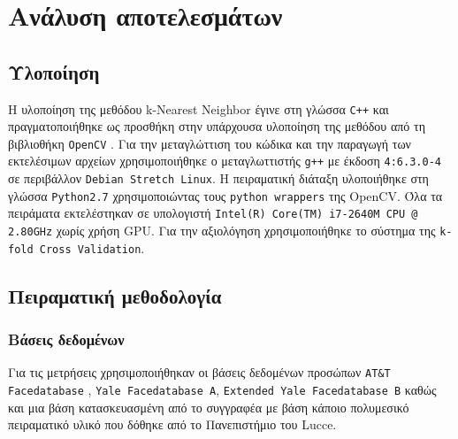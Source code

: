 \chapter{Ανάλυση αποτελεσμάτων}\label{ch:results}


\section{Υλοποίηση}\label{sec:implementation}
H υλοποίηση της μεθόδου k-Nearest Neighbor έγινε στη γλώσσα \texttt{C++} και πραγματοποιήθηκε
ως προσθήκη στην υπάρχουσα υλοποίηση της μεθόδου από τη βιβλιοθήκη \texttt{OpenCV} .
Για την μεταγλώττιση του κώδικα και την παραγωγή των εκτελέσιμων αρχείων χρησιμοποιήθηκε
ο μεταγλωττιστής \texttt{g++} με έκδοση \texttt{4:6.3.0-4} σε περιβάλλον \texttt{Debian Stretch Linux}.
Η πειραματική διάταξη υλοποιήθηκε στη γλώσσα \texttt{Python2.7} χρησιμοποιώντας
τους \texttt{python wrappers} της OpenCV. Όλα τα πειράματα εκτελέστηκαν σε υπολογιστή
\texttt{Intel(R) Core(TM) i7-2640M CPU @ 2.80GHz} χωρίς χρήση GPU. Για την αξιολόγηση
χρησιμοποιήθηκε το σύστημα της \texttt{k-fold Cross Validation}.


\section{Πειραματική μεθοδολογία}\label{sec:methodology}
\subsection{Βάσεις δεδομένων}
Για τις μετρήσεις χρησιμοποιήθηκαν οι βάσεις δεδομένων προσώπων \texttt{AT\&T Facedatabase}
,
\texttt{Yale Facedatabase A},
\texttt{Extended Yale Facedatabase B}
καθώς και μια βάση κατασκευασμένη από το συγγραφέα με βάση κάποιο πολυμεσικό πειραματικό
υλικό που δόθηκε από το Πανεπιστήμιο του Lucce.

